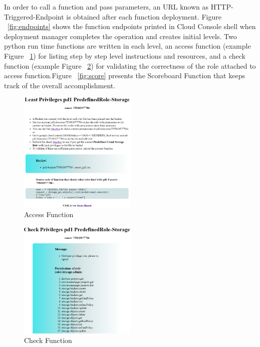 \documentclass[sigconf]{acmart}
\begin{document}
In order to call a function and pass parameters, an URL known as HTTP-Triggered-Endpoint is obtained after each function deployment. Figure ~\ref{fig:endpoints} shows the function endpoints printed in Cloud Console shell when deployment manager completes the operation and creates initial levels.
Two python run time functions are written in each level, an access function (example Figure ~\ref{fig:access}) for listing step by step level instructions and resources, and a check function (example Figure ~\ref{fig:check}) for validating the correctness of the role attached to access function.Figure  ~\ref{fig:score} presents the Scoreboard Function that keeps track of the overall accomplishment.  
\begin{figure}[h]
  \centering
  \includegraphics[width=0.5\textwidth]{pic/access}
  \caption {Access Function}
  \label{fig:access}
\end{figure}
\begin{figure}[h]
  \centering
  \includegraphics[width=0.5\textwidth]{pic/check}
  \caption {Check Function}
  \label{fig:check}
\end{figure}
\end{document}
